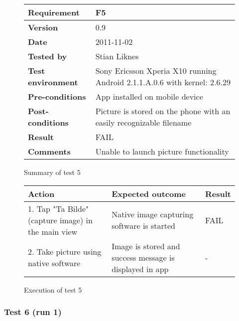 	\begin{figure}[htb]
		\centering
		\begin{tabular}{|p{3.5cm}|p{7.0cm}|} \hline
			\textbf{Requirement} & F5 \\ \hline
			\textbf{Version} & 0.9 \\ \hline
			\textbf{Date} & 2011-11-02 \\ \hline
			\textbf{Tested by} & Stian Liknes \\ \hline
			\textbf{Test environment} & Sony Ericsson Xperia X10 running Android 2.1.1.A.0.6 with kernel: 2.6.29 \\ \hline
			\textbf{Pre-conditions} & App installed on mobile device \\ \hline
			\textbf{Post-conditions} & Picture is stored on the phone with an easily recognizable filename \\ \hline
			\textbf{Result} & FAIL \\ \hline
			\textbf{Comments} & Unable to launch picture functionality \\ \hline
		\end{tabular}
		\caption{Summary of test 5}
	\end{figure}

	\begin{figure}[htb]
		\centering
		\begin{tabular}{|p{5.0cm}|p{5.0cm}|p{1cm}|}
			\hline \textbf{Action} & \textbf{Expected outcome} & \textbf{Result} \\ \hline
			1. Tap "Ta Bilde" (capture image) in the main view &
			Native image capturing software is started & 
			FAIL \\ \hline

			2. Take picture using native software &
			Image is stored and success message is displayed in app &
			-\\ \hline
		\end{tabular}
		\caption{Execution of test 5}
	\end{figure}

\newpage
\subsubsection{Test 6 (run 1)}

